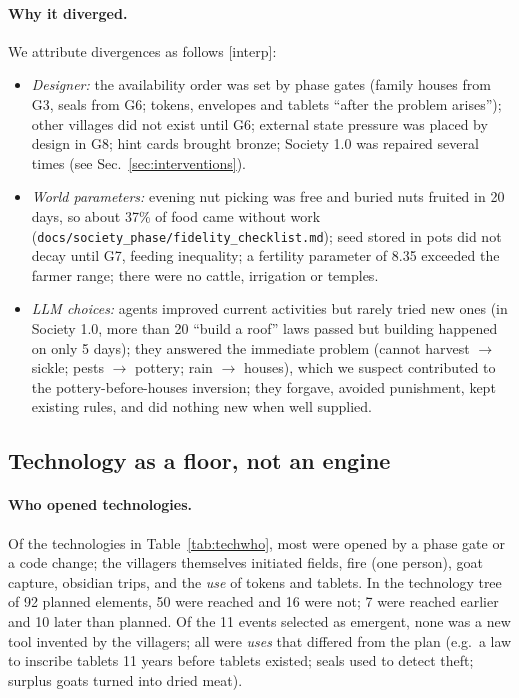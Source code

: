 \documentclass[11pt]{article}
\newcommand{\lbl}[1]{\textsf{[#1]}}
\begin{document}
\paragraph{Why it diverged.} We attribute divergences as follows \lbl{interp}:
\begin{itemize}
  \item \emph{Designer:} the availability order was set by phase gates (family houses from G3, seals from G6; tokens, envelopes and tablets ``after the problem arises''); other villages did not exist until G6; external state pressure was placed by design in G8; hint cards brought bronze; Society 1.0 was repaired several times (see Sec.~\ref{sec:interventions}).
  \item \emph{World parameters:} evening nut picking was free and buried nuts fruited in 20 days, so about 37\% of food came without work (\texttt{docs/society\_phase/fidelity\_checklist.md}); seed stored in pots did not decay until G7, feeding inequality; a fertility parameter of 8.35 exceeded the farmer range; there were no cattle, irrigation or temples.
  \item \emph{LLM choices:} agents improved current activities but rarely tried new ones (in Society 1.0, more than 20 ``build a roof'' laws passed but building happened on only 5 days); they answered the immediate problem (cannot harvest $\rightarrow$ sickle; pests $\rightarrow$ pottery; rain $\rightarrow$ houses), which we suspect contributed to the pottery-before-houses inversion; they forgave, avoided punishment, kept existing rules, and did nothing new when well supplied.
\end{itemize}

\subsection{Technology as a floor, not an engine}
\label{sec:tech}

\paragraph{Who opened technologies.} Of the technologies in Table~\ref{tab:techwho}, most were opened by a phase gate or a code change; the villagers themselves initiated fields, fire (one person), goat capture, obsidian trips, and the \emph{use} of tokens and tablets. In the technology tree of 92 planned elements, 50 were reached and 16 were not; 7 were reached earlier and 10 later than planned. Of the 11 events selected as emergent, none was a new tool invented by the villagers; all were \emph{uses} that differed from the plan (e.g.\ a law to inscribe tablets 11 years before tablets existed; seals used to detect theft; surplus goats turned into dried meat).
\end{document}
